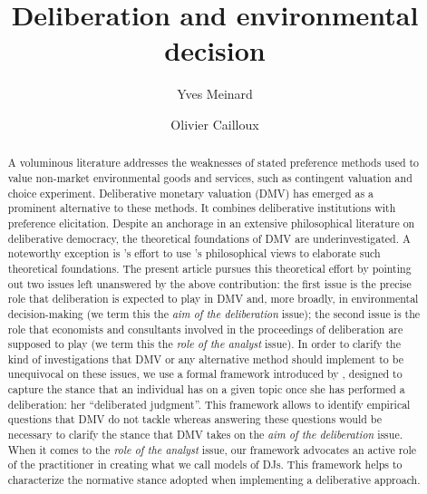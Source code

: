 \documentclass[version=3.21, pagesize, twoside=off, bibliography=totoc, DIV=calc, fontsize=12pt, a4paper, french, english]{scrartcl}
\newcommand{\institute}[1]{}
\newcommand{\keywords}[1]{}
\begin{document}
\title{Deliberation and environmental decision}
\author{Yves Meinard \and Olivier Cailloux}
\institute{
	Yves Meinard
	\and
	Olivier Cailloux 
	\at 
	Université Paris-Dauphine, \\
	PSL Research University, \\
	CNRS, \\
	LAMSADE\\
	75016 PARIS, FRANCE\\
	\email{olivier.cailloux@dauphine.fr}
}
\makeatletter
\makeatother
\maketitle

\keywords{decision aid, justification, empirical validation, methodology}

\begin{abstract}
A voluminous literature addresses the weaknesses of stated preference methods used to value non-market environmental goods and services, such as contingent valuation and choice experiment. 
Deliberative monetary valuation (DMV) has emerged as a prominent alternative to these methods. It combines deliberative institutions with preference elicitation. 
Despite an anchorage in an extensive philosophical literature on deliberative democracy, the theoretical foundations of DMV are underinvestigated.  
A noteworthy exception is \citeauthor{bartkowski_beyond_2018}'s effort to use \citeauthor{sen_idea_2009}'s philosophical views to elaborate such theoretical foundations. 
The present article pursues this theoretical effort by pointing out two issues left unanswered by the above contribution: 
the first issue is the precise role that deliberation is expected to play in DMV and, more broadly, in environmental decision-making (we term this the \emph{aim of the deliberation} issue); 
the second issue is the role that economists and consultants involved in the proceedings of deliberation are supposed to play (we term this the \emph{role of the analyst} issue). 
In order to clarify the kind of investigations that DMV or any alternative method should implement to be unequivocal on these issues, we use a formal framework introduced by \citeauthor{cailloux_formal_2018}, designed to capture the stance that an individual has on a given topic once she has performed a deliberation: her ``deliberated judgment''. 
This framework allows to identify empirical questions that DMV do not tackle whereas answering these questions would be necessary to clarify the stance that DMV takes on the \emph{aim of the deliberation} issue. 
When it comes to the \emph{role of the analyst} issue, our framework advocates an active role of the practitioner in creating what we call models of \aclp{DJ}. 
This framework helps to characterize the normative stance adopted when implementing a deliberative approach.
\end{abstract}
\end{document}
